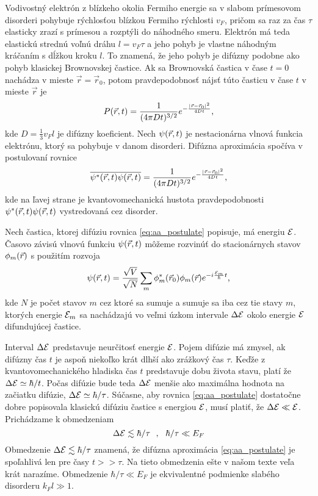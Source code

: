  Vodivostný elektrón z blízkeho okolia Fermiho energie sa v slabom prímesovom disorderi pohybuje rýchlosťou blízkou Fermiho rýchlosti $v_F$, pričom sa raz za čas $\tau$ elasticky zrazí s prímesou a rozptýli do náhodného smeru. Elektrón má teda elastickú strednú voľnú dráhu $l=v_F\tau$ a jeho pohyb je vlastne náhodným kráčaním s dĺžkou kroku $l$. To znamená, že jeho pohyb je difúzny podobne ako pohyb klasickej Brownovskej častice.
Ak sa Brownovská častica v čase $t=0$ nachádza v mieste $\vec r = \vec r_0$, potom pravdepodobnosť nájsť túto časticu v čase $t$  v mieste $\vec r$ je
\begin{equation}
 \label{eq:diffusion}
 P(\vec{r},t)=\frac{1}{(4\pi Dt)^{3/2}}e^{-\frac{|\vec{r}-\vec{r}_0|^2}{4Dt}} \text{,}
\end{equation}
kde $D =\frac{1}{3}v_Fl $ je difúzny koeficient.
Nech $\psi(\vec{r},t)$ je nestacionárna vlnová funkcia elektrónu, ktorý sa pohybuje v danom disorderi.
Difúzna aproximácia spočíva v postulovaní rovnice
\begin{equation}
 \label{eq:aa_postulate}
 \overline{\psi^*(\vec{r},t)\psi(\vec{r},t)}=\frac{1}{(4\pi Dt)^{3/2}}e^{-\frac{|\vec{r}-\vec{r}_0|^2}{4Dt}} \text{,}
\end{equation}
kde na ľavej strane je kvantovomechanická hustota pravdepodobnosti $\psi^*(\vec{r},t)\psi(\vec{r},t)$ vystredovaná cez disorder.

Nech častica, ktorej difúziu rovnica \eqref{eq:aa_postulate} popisuje, má energiu $\mathcal{E}$.
Časovo závisú vlnovú funkciu $\psi(\vec{r},t)$ môžeme rozvinúť do stacionárnych stavov $\phi_m(\vec{r})$ s použitím rozvoja
\begin{equation}
 \label{eq:aa_psi_sum}
 \psi(\vec{r},t)=\frac{\sqrt{V}}{\sqrt{N}}\sum_m \phi_m^*(\vec{r}_0)\phi_m(\vec{r})e^{-i\frac{\mathcal{E}_m}{\hbar}t} \text{,}
\end{equation}
kde $N$ je počet stavov $m$ cez ktoré sa sumuje a sumuje sa iba cez tie stavy $m$, ktorých energie $\mathcal{E}_m$ sa nachádzajú vo veľmi úzkom intervale $\Delta \mathcal{E}$ okolo energie $\mathcal{E}$ difundujúcej častice.

Interval $\Delta \mathcal{E}$ predstavuje neurčitosť energie $\mathcal{E}$. Pojem difúzie má zmysel, ak difúzny čas $t$ je aspoň niekoľko krát dlhší ako zrážkový čas $\tau$. Keďže z kvantovomechanického hladiska čas $t$ predstavuje
dobu života stavu, platí že $\Delta \mathcal{E} \simeq \hbar/t$. Počas difúzie bude teda $\Delta \mathcal{E}$ menšie ako maximálna hodnota na začiatku difúzie, $\Delta \mathcal{E} \simeq \hbar/\tau$. Súčasne, aby rovnica \eqref{eq:aa_postulate} dostatočne dobre popisovala
klasickú difúziu častice s energiou $\mathcal{E}$, musí platiť, že $\Delta \mathcal{E} \ll \mathcal{E} $. Prichádzame k obmedzeniam
\begin{equation}
 \label{eq:obmedzenia}
 \Delta \mathcal{E} \lesssim \hbar/\tau \ \ , \ \  \hbar/\tau \ll E_F
\end{equation}
Obmedzenie $\Delta \mathcal{E} \lesssim \hbar/\tau$ znamená, že difúzna aproximácia \eqref{eq:aa_postulate} je spoľahlivá len pre časy $t >> \tau$. Na tieto obmedzenia ešte v našom texte
veľa krát narazíme.  Obmedzenie $\hbar/\tau \ll E_F$ je ekvivalentné podmienke slabého disorderu $k_Fl \gg 1$.

